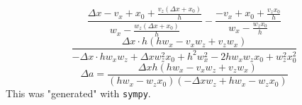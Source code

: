 \documentclass{article}
\begin{document}
$$
\frac{\Delta x - v_{x} + x_{0} + \frac{v_{z} \left(\Delta x + x_{0}\right)}{h}}{w_{x} - \frac{w_{z} \left(\Delta x + x_{0}\right)}{h}} - \frac{- v_{x} + x_{0} + \frac{v_{z} x_{0}}{h}}{w_{x} - \frac{w_{z} x_{0}}{h}}
$$
$$
\frac{\Delta x \cdot h \left(h w_{x} - v_{x} w_{z} + v_{z} w_{x}\right)}{- \Delta x \cdot h w_{x} w_{z} + \Delta x w_{z}^{2} x_{0} + h^{2} w_{x}^{2} - 2 h w_{x} w_{z} x_{0} + w_{z}^{2} x_{0}^{2}}
$$
$$
\Delta a = \frac{\Delta x h \left(h w_{x} - v_{x} w_{z} + v_{z} w_{x}\right)}{\left(h w_{x} - w_{z} x_{0}\right) \left(- \Delta x w_{z} + h w_{x} - w_{z} x_{0}\right)}
$$
This was "generated" with \texttt{sympy}.
\end{document}
